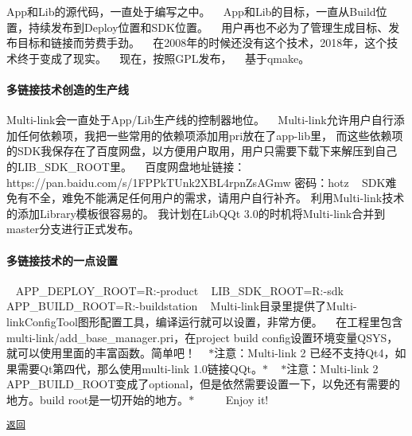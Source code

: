 App和\+Lib的源代码，一直处于编写之中。 ~\newline
App和\+Lib的目标，一直从\+Build位置，持续发布到\+Deploy位置和\+S\+D\+K位置。 ~\newline
用户再也不必为了管理生成目标、发布目标和链接而劳费手劲。 ~\newline
在2008年的时候还没有这个技术，2018年，这个技术终于变成了现实。 ~\newline
现在，按照\+G\+P\+L发布， ~\newline
基于qmake。 ~\newline
 ~\newline
 \paragraph*{多链接技术创造的生产线}

Multi-\/link会一直处于\+App/\+Lib生产线的控制器地位。 ~\newline
Multi-\/link允许用户自行添加任何依赖项，我把一些常用的依赖项添加用pri放在了app-\/lib里， 而这些依赖项的\+S\+D\+K我保存在了百度网盘，以方便用户取用，用户只需要下载下来解压到自己的\+L\+I\+B\+\_\+\+S\+D\+K\+\_\+\+R\+O\+O\+T里。 ~\newline
百度网盘地址链接：https\+://pan.baidu.\+com/s/1\+F\+P\+Pk\+T\+Unk2\+X\+B\+L4rpn\+Zs\+A\+Gmw 密码：hotz ~\newline
S\+D\+K难免有不全，难免不能满足任何用户的需求，请用户自行补齐。 利用\+Multi-\/link技术的添加\+Library模板很容易的。 我计划在\+Lib\+Q\+Qt 3.\+0的时机将\+Multi-\/link合并到master分支进行正式发布。 ~\newline
 ~\newline


\paragraph*{多链接技术的一点设置}

 ~\newline
A\+P\+P\+\_\+\+D\+E\+P\+L\+O\+Y\+\_\+\+R\+O\+OT=R\+:-\/product ~\newline
L\+I\+B\+\_\+\+S\+D\+K\+\_\+\+R\+O\+OT=R\+:-\/sdk ~\newline
A\+P\+P\+\_\+\+B\+U\+I\+L\+D\+\_\+\+R\+O\+OT=R\+:-\/buildstation ~\newline
Multi-\/link目录里提供了\+Multi-\/link\+Config\+Tool图形配置工具，编译运行就可以设置，非常方便。 ~\newline
在工程里包含multi-\/link/add\+\_\+base\+\_\+manager.pri，在project build config设置环境变量\+Q\+S\+Y\+S，就可以使用里面的丰富函数。简单吧！ ~\newline
$\ast$注意：\+Multi-\/link 2 已经不支持\+Qt4，如果需要\+Qt第四代，那么使用multi-\/link 1.\+0链接\+Q\+Qt。$\ast$ ~\newline
$\ast$注意：\+Multi-\/link 2 A\+P\+P\+\_\+\+B\+U\+I\+L\+D\+\_\+\+R\+O\+O\+T变成了optional，但是依然需要设置一下，以免还有需要的地方。build root是一切开始的地方。$\ast$ ~\newline
 ~\newline
 ~\newline
 Enjoy it! ~\newline


\href{.}{\tt 返回} 
